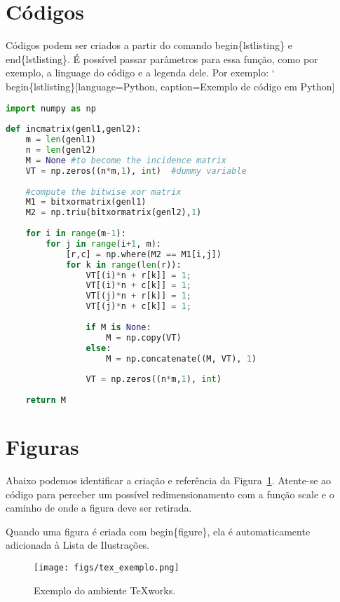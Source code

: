 \section{Códigos}
\label{s.codigos}

Códigos podem ser criados a partir do comando begin\{lstlisting\} e end\{lstlisting\}. É possível passar parâmetros para essa função, como por exemplo, a linguage do código e a legenda dele. Por exemplo: \char`\\begin\{lstlisting\}[language=Python, caption=Exemplo de código em Python]

\begin{lstlisting}[language=Python, caption=Exemplo de código em Python]
import numpy as np
 
def incmatrix(genl1,genl2):
    m = len(genl1)
    n = len(genl2)
    M = None #to become the incidence matrix
    VT = np.zeros((n*m,1), int)  #dummy variable
 
    #compute the bitwise xor matrix
    M1 = bitxormatrix(genl1)
    M2 = np.triu(bitxormatrix(genl2),1) 
 
    for i in range(m-1):
        for j in range(i+1, m):
            [r,c] = np.where(M2 == M1[i,j])
            for k in range(len(r)):
                VT[(i)*n + r[k]] = 1;
                VT[(i)*n + c[k]] = 1;
                VT[(j)*n + r[k]] = 1;
                VT[(j)*n + c[k]] = 1;
 
                if M is None:
                    M = np.copy(VT)
                else:
                    M = np.concatenate((M, VT), 1)
 
                VT = np.zeros((n*m,1), int)
 
    return M
\end{lstlisting}

\section{Figuras}
\label{s.figuras}

Abaixo podemos identificar a criação e referência da Figura~\ref{f.disposicao_mercado}. Atente-se ao código para perceber um possível redimensionamento com a função scale e o caminho de onde a figura deve ser retirada.

Quando uma figura é criada com begin\{figure\}, ela é automaticamente adicionada à Lista de Ilustrações.

\begin{figure}[h]
\caption{\small Exemplo do ambiente TeXworks.}
\centering
\texttt{[image: figs/tex\_exemplo.png]}
\label{f.disposicao_mercado}
\end{figure}

